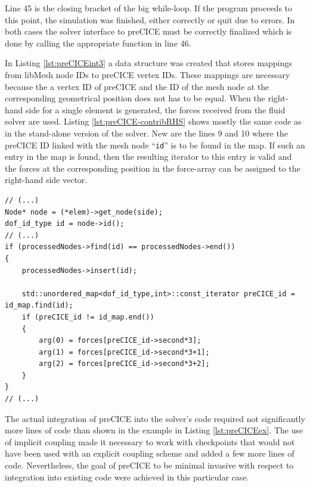    Line 45 is the closing bracket of the big while-loop. If the program proceeds to this point, the simulation was finished, either correctly or quit due to errors. In both cases the solver interface to preCICE must be correctly finalized which is done by calling the appropriate function in line 46.
   
   In Listing \ref{lst:preCICEint3} a data structure was created that stores mappings from libMesh node IDs to preCICE vertex IDs. These mappings are necessary because the a vertex ID of preCICE and the ID of the mesh node at the corresponding geometrical position does not has to be equal. When the right-hand side for a single element is generated, the forces received from the fluid solver are used. Listing \ref{lst:preCICE-contribRHS} shows mostly the same code as in the stand-alone version of the solver. New are the lines 9 and 10 where the preCICE ID linked with the mesh node ``\texttt{id}'' is to be found in the map. If such an entry in the map is found, then the resulting iterator to this entry is valid and the forces at the corresponding position in the force-array can be assigned to the right-hand side vector.   
\begin{lstlisting}[caption=Modification of contribRHS-function,label=lst:preCICE-contribRHS,keepspaces=true]
// (...)
Node* node = (*elem)->get_node(side);
dof_id_type id = node->id();
// (...)
if (processedNodes->find(id) == processedNodes->end())
{
	processedNodes->insert(id);

	std::unordered_map<dof_id_type,int>::const_iterator preCICE_id = id_map.find(id);
	if (preCICE_id != id_map.end())
	{
		arg(0) = forces[preCICE_id->second*3];
		arg(1) = forces[preCICE_id->second*3+1];
		arg(2) = forces[preCICE_id->second*3+2];
	}
}
// (...)
\end{lstlisting}   
   The actual integration of preCICE into the solver's code required not significantly more lines of code than shown in the example in Listing \ref{lst:preCICEex}. The use of implicit coupling made it necessary to work with checkpoints that would not have been used with an explicit coupling scheme and added a few more lines of code. Nevertheless, the goal of preCICE to be minimal invasive with respect to integration into existing code were achieved in this particular case.
\newpage
